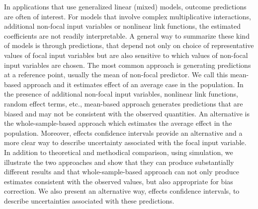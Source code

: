 In applications that use generalized linear (mixed) models, outcome predictions are often of interest. For models that involve complex multiplicative interactions, additional non-focal input variables or nonlinear link functions, the estimated coefficients are not readily interpretable. A general way to summarize these kind of models is through predictions, that depend not only on choice of representative values of focal input variables but are also sensitive to which values of non-focal input variables are chosen. The most common approach is generating predictions at a reference point, usually the mean of non-focal predictor. We call this mean-based approach and it estimates effect of an average case in the population. In the presence of additional non-focal input variables, nonlinear link functions, random effect terms, etc., mean-based approach generates predictions that are biased and may not be consistent with the observed quantities. An alternative is the whole-sample-based approach which estimates the average effect in the population. Moreover, effects confidence intervals provide an alternative and a more clear way to describe uncertainty associated with the focal input variable. In addition to theoretical and methodical comparison, using simulation, we illustrate the two approaches and show that they can produce substantially different results and that whole-sample-based approach can not only produce estimates consistent with the observed values, but also appropriate for bias correction. We also present an alternative way, effects confidence intervals, to describe uncertainties associated with these predictions.


